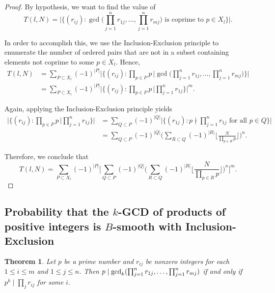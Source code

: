 \documentclass[12pt]{amsart}
\newtheorem{theorem}{Theorem}[subsection]
\theoremstyle{definition}
\begin{document}
\begin{proof}
By hypothesis, we want to find the value of
$$T(l,N) = \Big|\Big\{(r_{ij}) : \gcd\Big(\prod_{j=1}^nr_{1j}, ..., \prod_{j=1}^{n} r_{mj}\Big) \text{ is coprime to } p\in X_l \Big\}\Big|.$$
	
In order to accomplish this, we use the Inclusion-Exclusion principle to enumerate the number of ordered pairs that are not in a subset containing elements not coprime to some $p\in X_l$. Hence, 
	\begin{align*}
		T(l, N) &= \sum_{P\subset X_l}{(-1)^{|P|}}\Bigg|\Big\{(r_{ij}):\prod_{p\in P} p \, \Big| \gcd\Big(\prod_{j=1}^nr_{1j}, ... ,\prod_{j=1}^{n} r_{mj}\Big) \Big\} \Bigg|\\ &= \sum_{P\subset X_l}{(-1)^{|P|}} \Bigg|\Big\{(r_{ij}):\prod_{p\in P} p \, \Big| \prod_{j=1}^nr_{1j}\Big\}\Bigg|^m.
	\end{align*}
	
	\noindent Again, applying the Inclusion-Exclusion principle yields
	\begin{align*}
		\Bigg|\Big\{(r_{ij}):\prod_{p\in P} p \, \Big|\prod_{j=1}^nr_{1j}\Big\}\Bigg| &=\sum_{Q\subset P}(-1)^{|Q|}\Big|\Big\{(r_{1j}): p \nmid \prod_{j=1}^nr_{1j} \text{ for all } p\in Q \Big\}\Big|\\
		&=\sum_{Q\subset P}(-1)^{|Q|}\Biggl(\sum_{R\subset Q}(-1)^{|R|}\Biggl\lfloor\frac{N}{\prod_{p\in R} p}\Biggr\rfloor\Biggr)^n.
	\end{align*}
	
	\noindent Therefore, we conclude that
	$$T(l,N)=\sum_{P\subset X_l}{(-1)^{|P|}}\Bigg[\sum_{Q\subset P}(-1)^{|Q|}\Big(\sum_{R\subset Q}(-1)^{|R|}\Big\lfloor\frac{N}{\prod_{p\in R} p}\Big\rfloor\Big)^n\Bigg]^m.$$
\end{proof}

\subsection{Probability that the \texorpdfstring{$k$}{}-GCD of products of positive integers is \texorpdfstring{$B$}{}-smooth with Inclusion-Exclusion}

\begin{theorem} Let $p$ be a prime number and $r_{ij}$ be nonzero integers for each $1 \leq i \leq m$ and $1 \leq j \leq n$. Then
	$p \mid \gcd_k(\prod_{j=1}^{n}r_{1j},\mathellipsis,\prod_{j=1}^n r_{mj})$ if and only if $p^k \mid \prod_{j}r_{ij}$ for some $i$.
\end{theorem}
\end{document}
